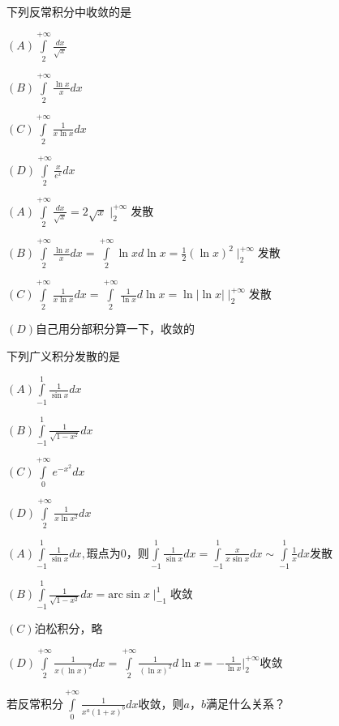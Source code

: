 \documentclass[lang=cn,10pt]{elegantbook}
\begin{document}
\begin{example}
	下列反常积分中收敛的是
	
$	(A)\int\limits_2^{+\infty}{\frac{dx}{\sqrt{x}}}$
	
	$(B)\int\limits_2^{+\infty}{\frac{\ln x}{x}dx}$
	 
	$(C)\int\limits_2^{+\infty}{\frac{1}{x\ln x}dx}$
	
	$(D)\int\limits_2^{+\infty}{\frac{x}{e^x}dx}$
\end{example}
\begin{solution}
	
	$(A)\int\limits_2^{+\infty}{\frac{dx}{\sqrt{x}}}=2\sqrt{x}\mid_{2}^{+\infty}$发散
	
	$(B)\int\limits_2^{+\infty}{\frac{\ln x}{x}dx}=\int\limits_2^{+\infty}{\ln xd\ln x=\frac{1}{2}\left( \ln x \right) ^2\mid_{2}^{+\infty}}$发散
	
	$(C)\int\limits_2^{+\infty}{\frac{1}{x\ln x}dx}=\int\limits_2^{+\infty}{\frac{1}{\ln x}d\ln x=\ln |\ln x|\mid_{2}^{+\infty}}
	$发散
	
	$(D)$自己用分部积分算一下，收敛的
	
	
\end{solution}
\begin{example}
	下列广义积分发散的是
	
	$(A)\int\limits_{-1}^1{\frac{1}{\sin x}dx}$
	
	$(B)\int\limits_{-1}^1{\frac{1}{\sqrt{1-x^2}}dx}$
	
$	(C)\int\limits_0^{+\infty}{e^{-x^2}dx}$
	
	$(D)\int\limits_2^{+\infty}{\frac{1}{x\ln x^2}dx}$
\end{example}
\begin{solution}
	
	$(A)\int\limits_{-1}^1{\frac{1}{\sin x}dx},\text{瑕点为}0\text{，则}\int\limits_{-1}^1{\frac{1}{\sin x}dx=\int\limits_{-1}^1{\frac{x}{x\sin x}dx}}\sim \int\limits_{-1}^1{\frac{1}{x}dx}\text{发散}
	$
	
	$ (B)\int\limits_{-1}^1{\frac{1}{\sqrt{1-x^2}}dx}=\mathrm{arc}\sin x\mid_{-1}^{1}$收敛
	
	
	$(C)$泊松积分，略
	
	$(D)\int\limits_2^{+\infty}{\frac{1}{x\left( \ln x \right) ^2}dx}=\int\limits_2^{+\infty}{\frac{1}{\left( \ln x \right) ^2}d\ln x=-\frac{1}{\ln x}|_{2}^{+\infty}}$收敛 
\end{solution}
\begin{example}
	若反常积分$\int\limits_0^{+\infty}{\frac{1}{x^a\left( 1+x \right) ^b}dx}$收敛，则$a$，$b$满足什么关系？
\end{example}
\end{document}
